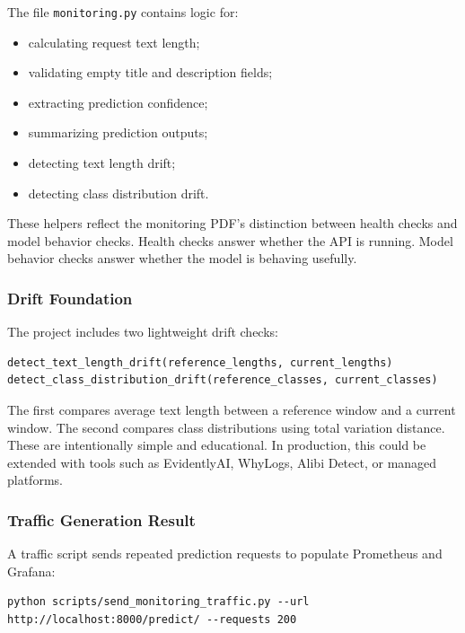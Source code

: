 \documentclass[11pt,a4paper]{article}
\begin{document}
The file \texttt{monitoring.py} contains logic for:

\begin{itemize}
    \item calculating request text length;
    \item validating empty title and description fields;
    \item extracting prediction confidence;
    \item summarizing prediction outputs;
    \item detecting text length drift;
    \item detecting class distribution drift.
\end{itemize}

These helpers reflect the monitoring PDF's distinction between health checks and model behavior checks. Health checks answer whether the API is running. Model behavior checks answer whether the model is behaving usefully.

\subsubsection{Drift Foundation}

The project includes two lightweight drift checks:

\begin{lstlisting}[style=projectcode]
detect_text_length_drift(reference_lengths, current_lengths)
detect_class_distribution_drift(reference_classes, current_classes)
\end{lstlisting}

The first compares average text length between a reference window and a current window. The second compares class distributions using total variation distance. These are intentionally simple and educational. In production, this could be extended with tools such as EvidentlyAI, WhyLogs, Alibi Detect, or managed platforms.

\subsubsection{Traffic Generation Result}

A traffic script sends repeated prediction requests to populate Prometheus and Grafana:

\begin{lstlisting}[style=projectcode]
python scripts/send_monitoring_traffic.py --url http://localhost:8000/predict/ --requests 200
\end{lstlisting}
\end{document}
